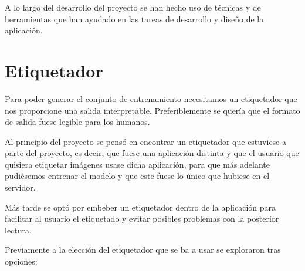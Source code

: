 \label{c.4}

A lo largo del desarrollo del proyecto se han hecho uso de técnicas y de herramientas que han ayudado en las tareas de desarrollo y diseño de la aplicación.

\section{Etiquetador}
Para poder generar el conjunto de entrenamiento necesitamos un etiquetador que nos proporcione una salida interpretable. Preferiblemente se quería que el formato de salida fuese legible para los humanos. 

Al principio del proyecto se pensó en encontrar un etiquetador que estuviese a parte del proyecto, es decir, que fuese una aplicación distinta y que el usuario que quisiera etiquetar imágenes usase dicha aplicación, para que más adelante pudiésemos entrenar el modelo y que este fuese lo único que hubiese en el servidor.

Más tarde se optó por embeber un etiquetador dentro de la aplicación para facilitar al usuario el etiquetado y evitar posibles problemas con la posterior lectura. 

Previamente a la elección del etiquetador que se ba a usar se exploraron tras opciones:

